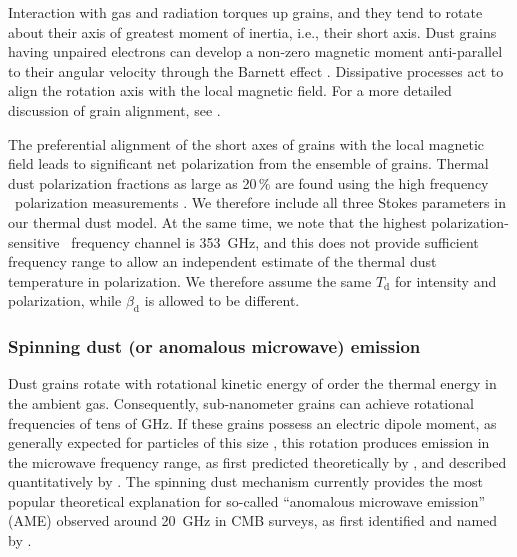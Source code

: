 \documentclass[onecolumn]{aa}
\begin{document}
Interaction with gas and radiation torques up grains, and they tend to rotate
about their axis of greatest moment of inertia, i.e., their short axis.
Dust grains having unpaired electrons can develop a non-zero
magnetic moment anti-parallel to their angular velocity through the Barnett effect
\citep{Dolginov1976}.
Dissipative processes act to align the rotation axis with the local magnetic field.
For a more detailed discussion of grain alignment, see \citet{Andersson2015}.

The preferential alignment of the short axes of grains with the local magnetic field
leads to significant net polarization from the ensemble of grains. Thermal dust polarization 
fractions as large as 20\,\% are found using the high frequency \Planck\ polarization
measurements \citep{planck2016-l11A}. We therefore include all three
Stokes parameters in our thermal dust model. At the same time, we note
that the highest polarization-sensitive \Planck\ frequency channel is
353~GHz, and this does not provide sufficient frequency range to allow
an independent estimate of the thermal dust temperature in polarization. We therefore assume
the same $T_{\mathrm{d}}$ for intensity and polarization, while
$\beta_{\mathrm{d}}$ is allowed to be different.

\subsubsection{Spinning dust (or anomalous microwave) emission}
\label{sec:ame}

Dust grains rotate with rotational kinetic energy of order the thermal
energy in the ambient gas. Consequently, sub-nanometer grains can achieve
rotational frequencies of tens of GHz. If these grains possess an electric dipole
moment, as generally expected for particles of this size \citep{MaciaEscatllar2020}, 
this rotation produces emission in the microwave frequency
range, as first predicted theoretically by \citet{erickson:1957}, and
described quantitatively by \citet{draine:1998}. The spinning dust
mechanism currently provides the most popular theoretical explanation
for so-called ``anomalous microwave emission'' (AME) observed around
20~GHz in CMB surveys, as first identified and named by
\citet{leitch:1997}.
\end{document}
